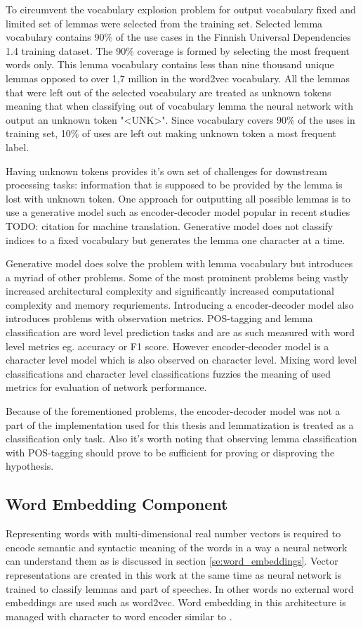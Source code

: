 \documentclass[12pt,a4paper,english
]{tutthesis}
\newcommand\todo[1]{{\color{red}TODO: #1}} %
\begin{document}
To circumvent the vocabulary explosion problem for output vocabulary fixed and limited set of lemmas were selected from the training set. Selected lemma vocabulary contains 90\% of the use cases in the Finnish Universal Dependencies 1.4 training dataset. The 90\% coverage is formed by selecting the most frequent words only. This lemma vocabulary contains less than nine thousand unique lemmas opposed to over 1,7 million in the word2vec vocabulary. All the lemmas that were left out of the selected vocabulary are treated as unknown tokens meaning that when classifying out of vocabulary lemma the neural network with output an unknown token "<UNK>". Since vocabulary covers 90\% of the uses in training set, 10\% of uses are left out making unknown token a most frequent label.

Having unknown tokens provides it's own set of challenges for downstream processing tasks: information that is supposed to be provided by the lemma is lost with unknown token. One approach for outputting all possible lemmas is to use a generative model such as encoder-decoder model popular in recent studies \todo{citation} for machine translation. Generative model does not classify indices to a fixed vocabulary but generates the lemma one character at a time.

Generative model does solve the problem with lemma vocabulary but introduces a myriad of other problems. Some of the most prominent problems being vastly increased architectural complexity and significantly increased computational complexity and memory requriements. Introducing a encoder-decoder model also introduces problems with observation metrics. POS-tagging and lemma classification are word level prediction tasks and are as such measured with word level metrics eg. accuracy or F1 score. However encoder-decoder model is a character level model which is also observed on character level. Mixing word level classifications and character level classifications fuzzies the meaning of used metrics for evaluation of network performance.

Because of the forementioned problems, the encoder-decoder model was not a part of the implementation used for this thesis and lemmatization is treated as a classification only task. Also it's worth noting that observing lemma classification with POS-tagging should prove to be sufficient for proving or disproving the hypothesis. 

\subsection{Word Embedding Component}
\label{ss:word_embedding_component}
Representing words with multi-dimensional real number vectors is required to encode semantic and syntactic meaning of the words in a way a neural network can understand them as is discussed in section \ref{se:word_embeddings}. Vector representations are created in this work at the same time as neural network is trained to classify lemmas and part of speeches. In other words no external word embeddings are used such as word2vec. Word embedding in this architecture is managed with character to word encoder similar to \cite{Ling2015}.
\end{document}
